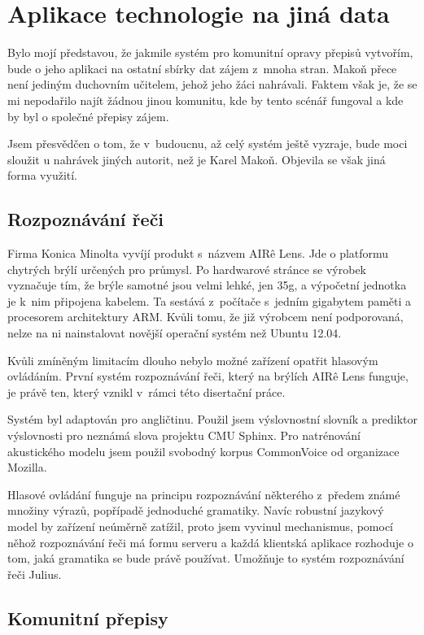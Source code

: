 \chapter{Aplikace technologie na jiná data}
\label{kap:jina-data}

Bylo mojí představou, že jakmile systém pro komunitní opravy přepisů vytvořím,
bude o jeho aplikaci na ostatní sbírky dat zájem z~mnoha stran. Makoň přece není
jediným duchovním učitelem, jehož jeho žáci nahrávali. Faktem však je, že se mi
nepodařilo najít žádnou jinou komunitu, kde by tento scénář fungoval a kde by
byl o společné přepisy zájem.

Jsem přesvědčen o tom, že v~budoucnu, až celý systém ještě vyzraje, bude moci
sloužit u nahrávek jiných autorit, než je Karel Makoň. Objevila se však jiná
forma využití.

\section{Rozpoznávání řeči}

Firma Konica Minolta vyvíjí produkt s~názvem AIR\^{e} Lens. Jde o platformu
chytrých brýlí určených pro průmysl. Po hardwarové stránce se výrobek vyznačuje
tím, že brýle samotné jsou velmi lehké, jen 35g, a výpočetní jednotka je k~nim
připojena kabelem. Ta sestává z~počítače s~jedním gigabytem paměti a procesorem
architektury ARM. Kvůli tomu, že již výrobcem není podporovaná, nelze na ni
nainstalovat novější operační systém než Ubuntu 12.04.

Kvůli zmíněným limitacím dlouho nebylo možné zařízení opatřit hlasovým
ovládáním. První systém rozpoznávání řeči, který na brýlích AIR\^{e} Lens
funguje, je právě ten, který vznikl v~rámci této disertační práce.

Systém byl adaptován pro angličtinu. Použil jsem výslovnostní slovník a
prediktor výslovnosti pro neznámá slova projektu CMU Sphinx\cite{lamere2003cmu}.
Pro natrénování akustického modelu jsem použil svobodný korpus CommonVoice od
organizace Mozilla.

Hlasové ovládání funguje na principu rozpoznávání některého z~předem známé
množiny výrazů, popřípadě jednoduché gramatiky. Navíc robustní jazykový model by
zařízení neúměrně zatížil, proto jsem vyvinul mechanismus, pomocí něhož
rozpoznávání řeči má formu serveru a každá klientská aplikace rozhoduje o tom,
jaká gramatika se bude právě používat. Umožňuje to systém rozpoznávání řeči
Julius\cite{lee2009recent}.

\section{Komunitní přepisy}

